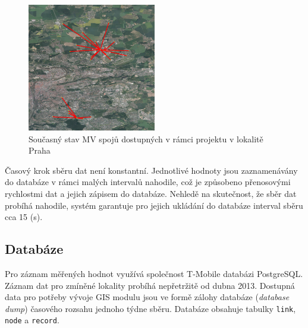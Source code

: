 \documentclass[a4paper,12pt,oneside]{report}
\begin{document}
\begin{figure}[h!]
    \centering
    \includegraphics[width=0.5\textwidth]{./img/letnany.png}
    \caption[Snapshot model]{Současný stav MV spojů dostupných v rámci projektu v lokalitě Praha  \centering  }
        \label{fig:snapshot}
 \end{figure} 
 Časový krok sběru dat není konstantní. Jednotlivé hodnoty jsou
 zaznamenávány do databáze v rámci malých intervalů nahodile, což je způsobeno přenosovými rychlostmi dat a jejich  zápisem do databáze. Nehledě na skutečnost, že sběr dat probíhá  nahodile, systém garantuje pro jejich ukládání do databáze interval sběru 
 cca 15 (s).




\subsection*{Databáze}  
Pro záznam měřených hodnot využívá společnost T-Mobile databázi
PostgreSQL. Záznam dat pro zmíněné lokality probíhá nepřetržitě od
dubna 2013. Dostupná data pro potřeby vývoje GIS modulu jsou ve formě
zálohy databáze (\textit{database dump}) časového rozsahu jednoho
týdne sběru. Databáze obsahuje tabulky \texttt{link}, \texttt{node} a
\texttt{record}.
 
\end{document}
